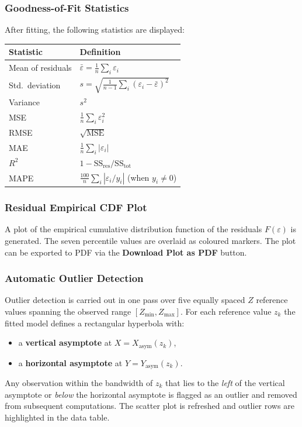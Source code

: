 \documentclass[12pt,a4paper]{article}
\begin{document}
\subsubsection{Goodness-of-Fit Statistics}

After fitting, the following statistics are displayed:

\begin{center}
\renewcommand{\arraystretch}{1.3}
\begin{tabular}{@{}ll@{}}
\toprule
\textbf{Statistic} & \textbf{Definition} \\
\midrule
Mean of residuals  & $\bar{\varepsilon} = \frac{1}{n}\sum_i \varepsilon_i$ \\
Std.\ deviation    & $s = \sqrt{\frac{1}{n-1}\sum_i (\varepsilon_i - \bar{\varepsilon})^2}$ \\
Variance           & $s^2$ \\
MSE                & $\frac{1}{n}\sum_i \varepsilon_i^2$ \\
RMSE               & $\sqrt{\text{MSE}}$ \\
MAE                & $\frac{1}{n}\sum_i |\varepsilon_i|$ \\
$R^2$              & $1 - \text{SS}_\text{res}/\text{SS}_\text{tot}$ \\
MAPE               & $\frac{100}{n}\sum_i |\varepsilon_i / y_i|$ (when $y_i \neq 0$) \\
\bottomrule
\end{tabular}
\end{center}

\subsubsection{Residual Empirical CDF Plot}

A plot of the empirical cumulative distribution function of the residuals
$F(\varepsilon)$ is generated.  The seven percentile values are overlaid as
coloured markers.  The plot can be exported to PDF via the
\textbf{Download Plot as PDF} button.

\subsubsection{Automatic Outlier Detection}

Outlier detection is carried out in one pass over five equally spaced $Z$ reference
values spanning the observed range $[Z_\min, Z_\max]$.  For each reference value
$z_k$ the fitted model defines a rectangular hyperbola with:
\begin{itemize}[leftmargin=1.5em]
    \item a \textbf{vertical asymptote} at $X = X_\text{asym}(z_k)$,
    \item a \textbf{horizontal asymptote} at $Y = Y_\text{asym}(z_k)$.
\end{itemize}
Any observation within the bandwidth of $z_k$ that lies to the \emph{left} of the
vertical asymptote or \emph{below} the horizontal asymptote is flagged as an outlier
and removed from subsequent computations.  The scatter plot is refreshed and outlier
rows are highlighted in the data table.
\end{document}
